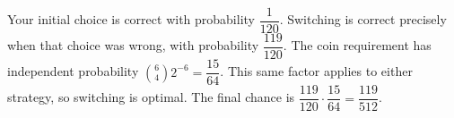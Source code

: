 Your initial choice is correct with probability $\dfrac{1}{120}$. Switching is correct precisely when that choice was wrong, with probability $\dfrac{119}{120}$. The coin requirement has independent probability $\binom64 2^{-6}=\dfrac{15}{64}$. This same factor applies to either strategy, so switching is optimal. The final chance is $\dfrac{119}{120}\cdot\dfrac{15}{64}=\boxed{\dfrac{119}{512}}$.
